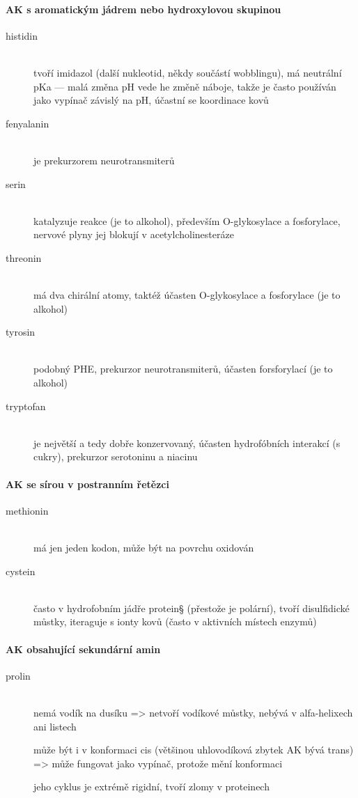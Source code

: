 \documentclass[DIV=8]{scrreprt}
\newcommand{\mybox}[2]{
    \paragraph{#1} #2
}
\begin{document}
\mybox{AK s aromatickým jádrem nebo hydroxylovou skupinou}{\begin{description}
\item[histidin]\hfill \\
tvoří imidazol (další nukleotid, někdy součástí wobblingu), má neutrální pKa --- malá změna pH vede he změně náboje, takže je často používán jako vypínač závislý na pH, účastní se koordinace kovů


\item[fenyalanin]\hfill \\
je prekurzorem neurotransmiterů


\item[serin]\hfill \\
katalyzuje reakce (je to alkohol), především O-glykosylace a fosforylace, nervové plyny jej blokují v acetylcholinesteráze


\item[threonin]\hfill \\
má dva chirální atomy, taktéž účasten O-glykosylace a fosforylace (je to alkohol)


\item[tyrosin]\hfill \\
podobný PHE, prekurzor neurotransmiterů, účasten forsforylací (je to alkohol)


\item[tryptofan]\hfill \\
je největší a tedy dobře konzervovaný, účasten hydrofóbních interakcí (s cukry), prekurzor serotoninu a niacinu

\end{description}
}


\mybox{AK se sírou v postranním řetězci}{\begin{description}
\item[methionin]\hfill \\
má jen jeden kodon, může být na povrchu oxidován


\item[cystein]\hfill \\
často v hydrofobním jádře protein§ (přestože je polární), tvoří disulfidické můstky, iteraguje s ionty kovů (často v aktivních místech enzymů)

\end{description}
}


\mybox{AK obsahující sekundární amin}{\begin{description}
\item[prolin]\hfill \\
nemá vodík na dusíku => netvoří vodíkové můstky, nebývá v alfa-helixech ani listech

může být i v konformaci cis (většinou uhlovodíková zbytek AK bývá trans) => může fungovat jako vypínač, protože mění konformaci

jeho cyklus je extrémě rigidní, tvoří zlomy v proteinech

\end{description}
}
\end{document}
